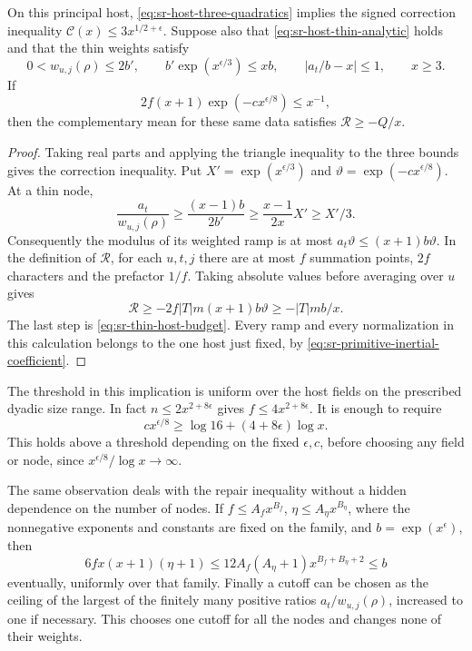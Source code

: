 \begin{srproposition}\label{prop:sr-host-signed-analytic-bridge}
On this principal host, \eqref{eq:sr-host-three-quadratics}
implies the signed correction inequality
\(\mathcal C(x)\leq3x^{1/2+\epsilon}\).
Suppose also that \eqref{eq:sr-host-thin-analytic} holds and that
the thin weights satisfy
\[
 0<w_{u,j}(\rho)\leq2b',\qquad
 b'\exp(x^{\epsilon/3})\leq xb,\qquad
 |a_t/b-x|\leq1,\qquad x\geq3 .
\]
If
\begin{equation}\label{eq:sr-thin-host-budget}
       2f(x+1)\exp(-c x^{\epsilon/8})\leq x^{-1},
\end{equation}
then the complementary mean for these same data satisfies
\(\mathcal R\geq-Q/x\).
\end{srproposition}
\begin{proof}
Taking real parts and applying the triangle inequality to the three
bounds gives the correction inequality.
Put \(X'=\exp(x^{\epsilon/3})\) and
\(\vartheta=\exp(-c x^{\epsilon/8})\).  At a thin node,
\[
 \frac{a_t}{w_{u,j}(\rho)}
   \geq \frac{(x-1)b}{2b'}
   \geq\frac{x-1}{2x}X'\geq X'/3 .
\]
Consequently the modulus of its weighted ramp is at most
\(a_t\vartheta\leq(x+1)b\vartheta\).
In the definition of \(\mathcal R\), for each \(u,t,j\)
there are at most \(f\) summation points, \(2f\) characters and
the prefactor \(1/f\).  Taking absolute values before averaging
over \(u\) gives
\[
 \mathcal R\geq-2f|T|m(x+1)b\vartheta\geq-|T|mb/x .
\]
The last step is \eqref{eq:sr-thin-host-budget}.
Every ramp and every normalization in this calculation belongs to the
one host just fixed, by \eqref{eq:sr-primitive-inertial-coefficient}.
\end{proof}

The threshold in this implication is uniform over the host fields
on the prescribed dyadic size range.  In fact
\(n\leq2x^{2+8\epsilon}\) gives \(f\leq4x^{2+8\epsilon}\).
It is enough to require
\[
       c x^{\epsilon/8}\geq\log16+(4+8\epsilon)\log x .
\]
This holds above a threshold depending on the fixed
\(\epsilon,c\), before choosing any field or node, since
\(x^{\epsilon/8}/\log x\longrightarrow\infty\).

The same observation deals with the repair inequality without a
hidden dependence on the number of nodes.  If
\(f\leq A_f x^{B_f}\), \(\eta\leq A_\eta x^{B_\eta}\),
where the nonnegative exponents and constants are fixed on the
family, and \(b=\exp(x^\epsilon)\), then
\[
 6f x(x+1)(\eta+1)
 \leq12A_f(A_\eta+1)x^{B_f+B_\eta+2}\leq b
\]
eventually, uniformly over that family.
Finally a cutoff can be chosen as the ceiling of the largest of the
finitely many positive ratios \(a_t/w_{u,j}(\rho)\), increased to
one if necessary.  This chooses one cutoff for all the nodes and
changes none of their weights.

